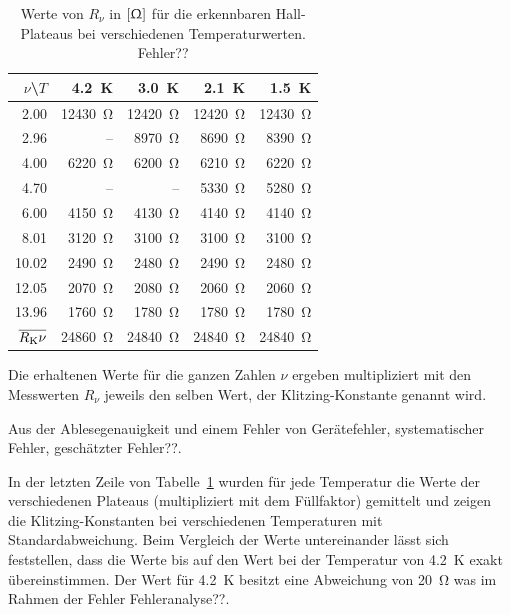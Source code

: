 \documentclass[paper=a4,fontsize=10pt,DIV=18,twocolumn,parskip=half]{scrartcl}
\numberwithin{equation}{section}    %
\newcommand{\note}[1]{{\color{red}#1??}}
\begin{document}
\begin{table}[htp]
	\begin{center}
	\begin{tabular}{r|rrrr}
		$\nu$\textbackslash$T$ & \SI{4.2}{\kelvin} & \SI{3.0}{\kelvin} & \SI{2.1}{\kelvin} & \SI{1.5}{\kelvin} \\
		\hline
		2.00  & \SI{12430}{\ohm} & \SI{12420}{\ohm} & \SI{12420}{\ohm} & \SI{12430}{\ohm}\\
		2.96  &      \--- &  \SI{8970}{\ohm} &  \SI{8690}{\ohm} &  \SI{8390}{\ohm}\\
		4.00  &  \SI{6220}{\ohm} &  \SI{6200}{\ohm} &  \SI{6210}{\ohm} &  \SI{6220}{\ohm}\\
		4.70  &      \--- &      \--- &  \SI{5330}{\ohm} &  \SI{5280}{\ohm}\\
		6.00  &  \SI{4150}{\ohm} &  \SI{4130}{\ohm} &  \SI{4140}{\ohm} &  \SI{4140}{\ohm}\\
		8.01  &  \SI{3120}{\ohm} &  \SI{3100}{\ohm} &  \SI{3100}{\ohm} &  \SI{3100}{\ohm}\\
		10.02 &  \SI{2490}{\ohm} &  \SI{2480}{\ohm} &  \SI{2490}{\ohm} &  \SI{2480}{\ohm}\\
		12.05 &  \SI{2070}{\ohm} &  \SI{2080}{\ohm} &  \SI{2060}{\ohm} &  \SI{2060}{\ohm}\\
		13.96 &  \SI{1760}{\ohm} &  \SI{1780}{\ohm} &  \SI{1780}{\ohm} &  \SI{1780}{\ohm}\\
		\hline
		$\overline{R_{\rm K}\nu}$ & \SI{24860}{\ohm} & \SI{24840}{\ohm} & \SI{24840}{\ohm} & \SI{24840}{\ohm}
	\end{tabular}
	\caption{Werte von $R_\nu$ in $\left[\Upomega\right]$ für die erkennbaren Hall-Plateaus bei verschiedenen Temperaturwerten. \note{Fehler}}
	\label{klitzing}	
	\end{center}
\end{table}

Die erhaltenen Werte für die ganzen Zahlen $\nu$ ergeben multipliziert mit den Messwerten $R_{\nu}$ jeweils den selben Wert, der Klitzing-Konstante genannt wird. 

Aus der Ablesegenauigkeit und einem Fehler von \note{Gerätefehler, systematischer Fehler, geschätzter Fehler}.

In der letzten Zeile von Tabelle~\ref{klitzing} wurden für jede Temperatur die Werte der verschiedenen Plateaus (multipliziert mit dem Füllfaktor) gemittelt und zeigen die Klitzing-Konstanten bei verschiedenen Temperaturen mit Standardabweichung. Beim Vergleich der Werte untereinander lässt sich feststellen, dass die Werte bis auf den Wert bei der Temperatur von \SI{4.2}{\kelvin} exakt übereinstimmen. Der Wert für \SI{4.2}{\kelvin} besitzt eine Abweichung von \SI{20}{\ohm} was im Rahmen der Fehler \note{Fehleranalyse}.
\end{document}
